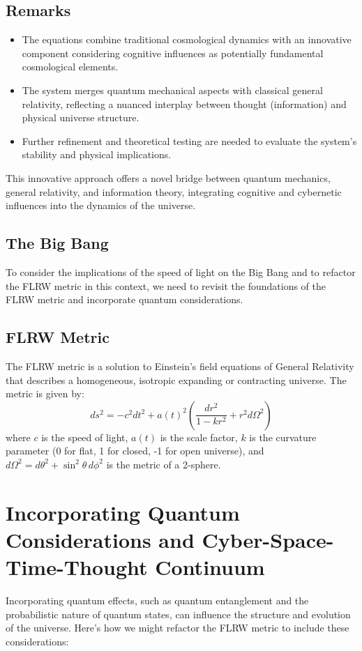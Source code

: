 \documentclass{article}
\begin{document}
\subsection*{Remarks}

\begin{itemize}
    \item The equations combine traditional cosmological dynamics with an innovative component considering cognitive influences as potentially fundamental cosmological elements.
    \item The system merges quantum mechanical aspects with classical general relativity, reflecting a nuanced interplay between thought (information) and physical universe structure.
    \item Further refinement and theoretical testing are needed to evaluate the system's stability and physical implications.
\end{itemize}

This innovative approach offers a novel bridge between quantum mechanics, general relativity, and information theory, integrating cognitive and cybernetic influences into the dynamics of the universe.
\subsection*{The Big Bang}
To consider the implications of the speed of light on the Big Bang and to refactor the FLRW metric in this context, we need to revisit the foundations of the FLRW metric and incorporate quantum considerations.

\subsection*{FLRW Metric}
The FLRW metric is a solution to Einstein's field equations of General Relativity that describes a homogeneous, isotropic expanding or contracting universe. The metric is given by:
\begin{equation}
ds^2 = -c^2 dt^2 + a(t)^2 \left( \frac{dr^2}{1 - kr^2} + r^2 d\Omega^2 \right)
\end{equation}
where $c$ is the speed of light, $a(t)$ is the scale factor, $k$ is the curvature parameter (0 for flat, 1 for closed, -1 for open universe), and $d\Omega^2 = d\theta^2 + \sin^2\theta \, d\phi^2$ is the metric of a 2-sphere.

\section*{Incorporating Quantum Considerations and Cyber-Space-Time-Thought Continuum}
Incorporating quantum effects, such as quantum entanglement and the probabilistic nature of quantum states, can influence the structure and evolution of the universe. Here’s how we might refactor the FLRW metric to include these considerations:
\end{document}
